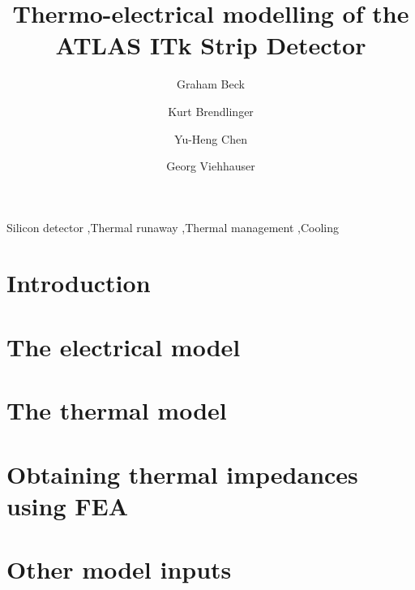 \documentclass[preprint]{elsarticle/elsarticle}
\begin{document}
\begin{frontmatter}

\title{Thermo-electrical modelling of the ATLAS ITk Strip Detector}
\author[1]{Graham Beck}      %
\author[2]{Kurt Brendlinger} %
\author[2]{Yu-Heng Chen}     %
\author[3]{Georg Viehhauser} %

\address[1]{Queen Mary University of London, Mile End Road, London E1 4NS, UK}
\address[2]{Deutsches Elektronen-Synchrotron DESY, Notkestra{\ss}e 85, 22607 Hamburg}
\address[3]{University of Oxford, Keble Rd, Oxford OX1 3RH, UK}

\begin{abstract}

\end{abstract}

\begin{keyword}
Silicon detector \sep Thermal runaway \sep Thermal management \sep Cooling
\end{keyword}

\end{frontmatter}

\section{Introduction}


\section{The electrical model}


\section{The thermal model}


\section{Obtaining thermal impedances using FEA}


\section{Other model inputs}

\end{document}
